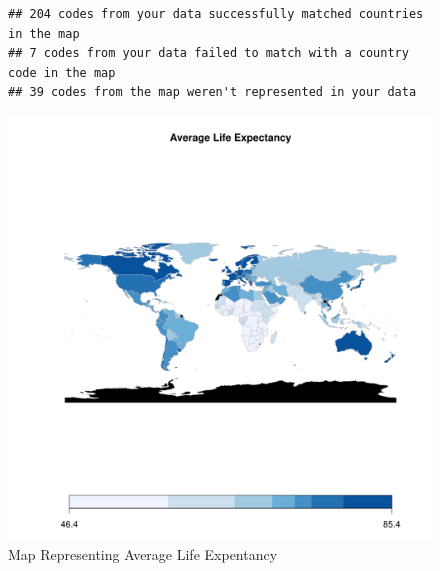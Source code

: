 \documentclass{article}\usepackage[]{graphicx}\usepackage[]{xcolor}
\makeatletter
\def\maxwidth{ %
  \ifdim\Gin@nat@width>\linewidth
    \linewidth
  \else
    \Gin@nat@width
  \fi
}
\newenvironment{kframe}{%
 \def\at@end@of@kframe{}%
 \ifinner\ifhmode%
  \def\at@end@of@kframe{\end{minipage}}%
  \begin{minipage}{\columnwidth}%
 \fi\fi%
 \def\FrameCommand##1{\hskip\@totalleftmargin \hskip-\fboxsep
 \colorbox{shadecolor}{##1}\hskip-\fboxsep
     \hskip-\linewidth \hskip-\@totalleftmargin \hskip\columnwidth}%
 \MakeFramed {\advance\hsize-\width
   \@totalleftmargin\z@ \linewidth\hsize
   \@setminipage}}%
 {\par\unskip\endMakeFramed%
 \at@end@of@kframe}
\newenvironment{knitrout}{}{} %
\makeatother
\begin{document}
\begin{figure}[h!]
\centering
\begin{knitrout}
\color{fgcolor}\begin{kframe}
\begin{verbatim}
## 204 codes from your data successfully matched countries in the map
## 7 codes from your data failed to match with a country code in the map
## 39 codes from the map weren't represented in your data
\end{verbatim}
\end{kframe}
\includegraphics[width=\maxwidth]{figure/unnamed-chunk-23-1} 
\end{knitrout}
\caption{Map Representing Average Life Expentancy}

\label{fig}
\end{figure}



\newpage
\end{document}
